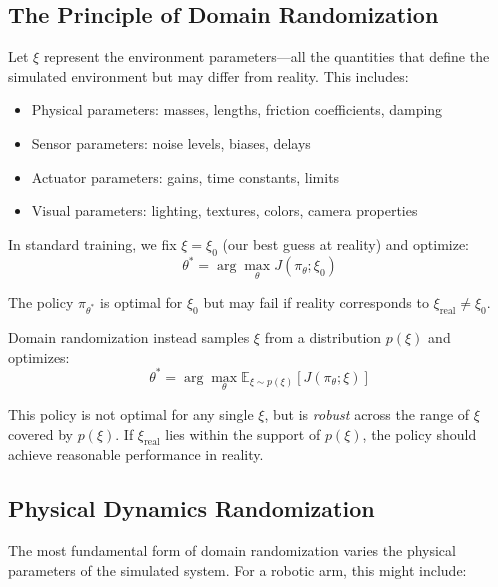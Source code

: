 \subsection{The Principle of Domain Randomization}

Let $\xi$ represent the environment parameters---all the quantities that define the simulated environment but may differ from reality. This includes:
\begin{itemize}
    \item Physical parameters: masses, lengths, friction coefficients, damping
    \item Sensor parameters: noise levels, biases, delays
    \item Actuator parameters: gains, time constants, limits
    \item Visual parameters: lighting, textures, colors, camera properties
\end{itemize}

In standard training, we fix $\xi = \xi_0$ (our best guess at reality) and optimize:
\begin{equation}
\theta^* = \arg\max_\theta J(\pi_\theta; \xi_0)
\end{equation}

The policy $\pi_{\theta^*}$ is optimal for $\xi_0$ but may fail if reality corresponds to $\xi_{\text{real}} \neq \xi_0$.

Domain randomization instead samples $\xi$ from a distribution $p(\xi)$ and optimizes:
\begin{equation}
\theta^* = \arg\max_\theta \mathbb{E}_{\xi \sim p(\xi)} \left[ J(\pi_\theta; \xi) \right]
\label{eq:domain_rand_objective}
\end{equation}

This policy is not optimal for any single $\xi$, but is \textit{robust} across the range of $\xi$ covered by $p(\xi)$. If $\xi_{\text{real}}$ lies within the support of $p(\xi)$, the policy should achieve reasonable performance in reality.


\subsection{Physical Dynamics Randomization}

The most fundamental form of domain randomization varies the physical parameters of the simulated system. For a robotic arm, this might include:

